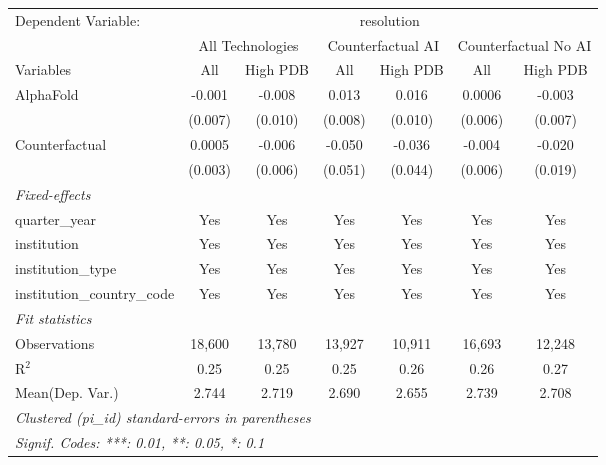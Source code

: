 \begingroup
\centering
\begin{tabular}{lcccccc}
   \tabularnewline \midrule \midrule
   Dependent Variable: & \multicolumn{6}{c}{resolution}\\
 & \multicolumn{2}{c}{All Technologies} & \multicolumn{2}{c}{Counterfactual AI} & \multicolumn{2}{c}{Counterfactual No AI} \\
\cmidrule(lr){1-1}\cmidrule(lr){2-3} \cmidrule(lr){4-5} \cmidrule(lr){6-7}
Variables & \multicolumn{1}{c}{All} & \multicolumn{1}{c}{High PDB} & \multicolumn{1}{c}{All} & \multicolumn{1}{c}{High PDB} & \multicolumn{1}{c}{All} & \multicolumn{1}{c}{High PDB} \\
\cmidrule(lr){1-1}\cmidrule(lr){2-2} \cmidrule(lr){3-3} \cmidrule(lr){4-4} \cmidrule(lr){5-5} \cmidrule(lr){6-6} \cmidrule(lr){7-7}
   AlphaFold                    & -0.001  & -0.008  & 0.013   & 0.016   & 0.0006  & -0.003\\   
                                & (0.007) & (0.010) & (0.008) & (0.010) & (0.006) & (0.007)\\   
   Counterfactual               & 0.0005  & -0.006  & -0.050  & -0.036  & -0.004  & -0.020\\   
                                & (0.003) & (0.006) & (0.051) & (0.044) & (0.006) & (0.019)\\   
   \midrule
   \emph{Fixed-effects}\\
   quarter\_year                & Yes     & Yes     & Yes     & Yes     & Yes     & Yes\\  
   institution                  & Yes     & Yes     & Yes     & Yes     & Yes     & Yes\\  
   institution\_type            & Yes     & Yes     & Yes     & Yes     & Yes     & Yes\\  
   institution\_country\_code   & Yes     & Yes     & Yes     & Yes     & Yes     & Yes\\  
   \midrule
   \emph{Fit statistics}\\
   Observations                 & 18,600  & 13,780  & 13,927  & 10,911  & 16,693  & 12,248\\  
   R$^2$                        & 0.25    & 0.25    & 0.25    & 0.26    & 0.26    & 0.27\\  
Mean(Dep. Var.) & 2.744 & 2.719 & 2.690 & 2.655 & 2.739 & 2.708 \\
   \midrule \midrule
   \multicolumn{7}{l}{\emph{Clustered (pi\_id) standard-errors in parentheses}}\\
   \multicolumn{7}{l}{\emph{Signif. Codes: ***: 0.01, **: 0.05, *: 0.1}}\\
\end{tabular}
\par\endgroup
